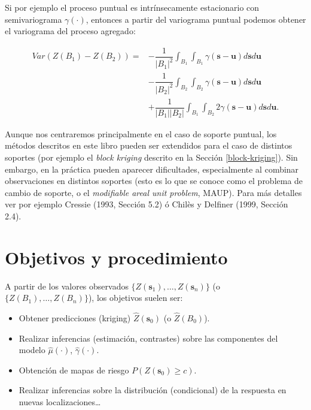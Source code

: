 \documentclass[
  spanish,
]{book}
\theoremstyle{break}
\theoremstyle{definition}
\theoremstyle{definition}
\theoremstyle{definition}
\theoremstyle{definition}
\theoremstyle{remark}
\begin{document}
Si por ejemplo el proceso puntual es intrínsecamente estacionario con semivariograma \(\gamma (\cdot)\), entonces a partir del variograma puntual podemos obtener el variograma del proceso agregado:

\[\begin{aligned}
Var\left( Z(B_1)-Z(B_2)\right) = & -\dfrac{1}{\left| B_1 \right| ^{2} } 
\int_{B_1 }\int_{B_1 }\gamma(\mathbf{s}-\mathbf{u})d\mathbf{s}d\mathbf{u}   \\
  & -\dfrac{1}{\left| B_2 \right|^{2} } \int_{B_2}\int_{B_2}\gamma(\mathbf{s}-\mathbf{u})d\mathbf{s}d\mathbf{u}   \\
 & +\dfrac{1}{\left| B_1 \right| \left| B_2 \right| } \int_{B_1 }\int_{B_2} 2\gamma(\mathbf{s}-\mathbf{u})d\mathbf{s}d\mathbf{u}. 
\end{aligned}\]

Aunque nos centraremos principalmente en el caso de soporte puntual, los métodos descritos en este libro pueden ser extendidos para el caso de distintos soportes (por ejemplo el \emph{block kriging} descrito en la Sección \ref{block-kriging}).
Sin embargo, en la práctica pueden aparecer dificultades, especialmente al combinar observaciones en distintos soportes (esto es lo que se conoce como el problema de cambio de soporte, o el \emph{modifiable areal unit problem}, MAUP).
Para más detalles ver por ejemplo Cressie (1993, Sección 5.2) ó Chilès y Delfiner (1999, Sección 2.4).

\hypertarget{objetivos-esquema}{%
\section{Objetivos y procedimiento}\label{objetivos-esquema}}

A partir de los valores observados \(\{Z(\mathbf{s}_1), \ldots, Z(\mathbf{s}_n)\}\) (o \(\{Z(B_1), \ldots, Z(B_n)\}\)), los objetivos suelen ser:

\begin{itemize}
\item
  Obtener predicciones (kriging) \(\hat{Z}(\mathbf{s}_0)\) (o \(\hat{Z}(B_0)\)).
\item
  Realizar inferencias (estimación, contrastes) sobre las componentes
  del modelo \(\hat{\mu}(\cdot)\), \(\hat{\gamma}(\cdot)\).
\item
  Obtención de mapas de riesgo \(P({Z}(\mathbf{s}_0)\geq c)\).
\item
  Realizar inferencias sobre la distribución (condicional) de la respuesta
  en nuevas localizaciones\ldots{}
\end{itemize}
\end{document}
